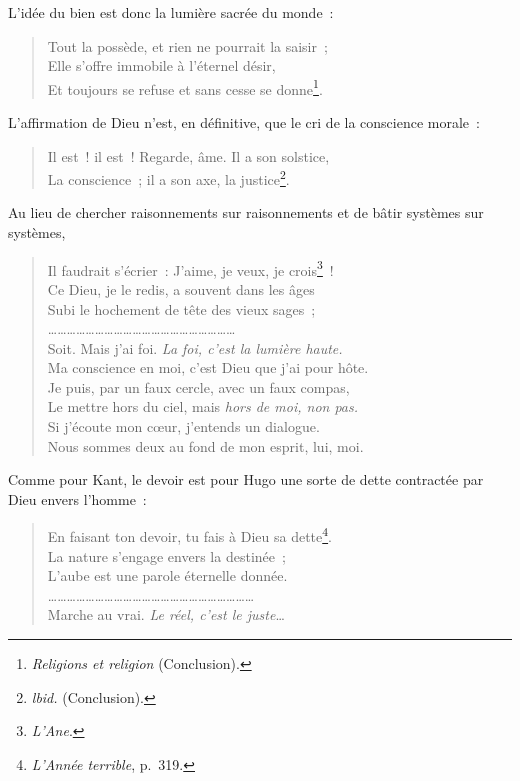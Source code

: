 \documentclass[french,twoside]{book} %
\begin{document}
\noindent L’idée du bien est donc la lumière sacrée du monde :\par


\begin{verse}
Tout la possède, et rien ne pourrait la saisir ;\\
Elle s’offre immobile à l’éternel désir,\\
Et toujours se refuse et sans cesse se donne\footnote{\emph{Religions et religion} (Conclusion).}.\\
\end{verse}

\noindent L’affirmation de Dieu n’est, en définitive, que le cri de la conscience morale :\par


\begin{verse}
Il est ! il est ! Regarde, âme. Il a son solstice,\\
La conscience ; il a son axe, la justice\footnote{\emph{lbid.} (Conclusion).}.\\
\end{verse}

\noindent Au lieu de chercher raisonnements sur raisonnements et de bâtir systèmes sur systèmes,\par


\begin{verse}
Il faudrait s’écrier : J’aime, je veux, je crois\footnote{\emph{L’Ane}.} !\\
Ce Dieu, je le redis, a souvent dans les âges\\
Subi le hochement de tête des vieux sages ;\\
……………………………………………………\\
Soit. Mais j’ai foi. \emph{La foi, c’est la lumière haute.}\\
Ma conscience en moi, c’est Dieu que j’ai pour hôte.\\
Je puis, par un faux cercle, avec un faux compas,\\
Le mettre hors du ciel, mais \emph{hors de moi, non pas.}\\
Si j’écoute mon cœur, j’entends un dialogue.\\
Nous sommes deux au fond de mon esprit, lui, moi.\\
\end{verse}

\noindent Comme pour Kant, le devoir est pour Hugo une sorte de dette contractée par Dieu envers l’homme :\par


\begin{verse}
En faisant ton devoir, tu fais à Dieu sa dette\footnote{\emph{L’Année terrible}, p. 319.}.\\
La nature s’engage envers la destinée ;\\
L’aube est une parole éternelle donnée.\\
…………………………………………………………\\
Marche au vrai. \emph{Le réel, c’est le juste}…\\
\end{verse}
\end{document}
